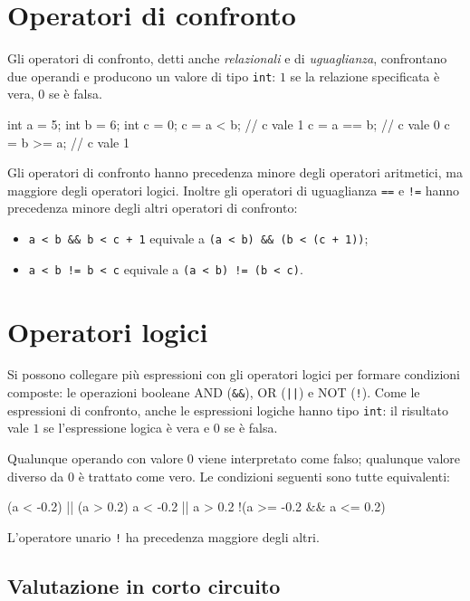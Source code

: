 \documentclass[11pt,a4paper]{article}
\begin{document}
\section{Operatori di confronto}

Gli operatori di confronto, detti anche \emph{relazionali} e di \emph{uguaglianza}, confrontano due operandi e producono un valore di tipo \lstinline|int|: $1$ se la relazione specificata è vera, $0$ se è falsa.

\begin{esempio}
\begin{codice}
int a = 5;
int b = 6;
int c = 0;
c = a < b;     // c vale 1
c = a == b;    // c vale 0
c = b >= a;    // c vale 1
\end{codice}
\end{esempio}

Gli operatori di confronto hanno precedenza minore degli operatori aritmetici, ma maggiore degli operatori logici. Inoltre gli operatori di uguaglianza \lstinline|==| e \lstinline|!=| hanno precedenza minore degli altri operatori di confronto:
\begin{itemize}
    \item \lstinline|a < b && b < c + 1| equivale a \lstinline|(a < b) && (b < (c + 1))|;
    \item \lstinline|a < b != b < c| equivale a \lstinline|(a < b) != (b < c)|.
\end{itemize}

\section{Operatori logici}

Si possono collegare più espressioni con gli operatori logici per formare condizioni composte: le operazioni booleane AND (\lstinline|&&|), OR (\lstinline/||/) e NOT (\lstinline|!|). Come le espressioni di confronto, anche le espressioni logiche hanno tipo \lstinline|int|: il risultato vale $1$ se l'espressione logica è vera e $0$ se è falsa.

Qualunque operando con valore $0$ viene interpretato come falso; qualunque valore diverso da $0$ è trattato come vero. Le condizioni seguenti sono tutte equivalenti:
\begin{codice}
(a < -0.2) || (a > 0.2)
a < -0.2 || a > 0.2
!(a >= -0.2 && a <= 0.2)
\end{codice}
L'operatore unario \lstinline|!| ha precedenza maggiore degli altri.

\subsection{Valutazione in corto circuito}
\end{document}
